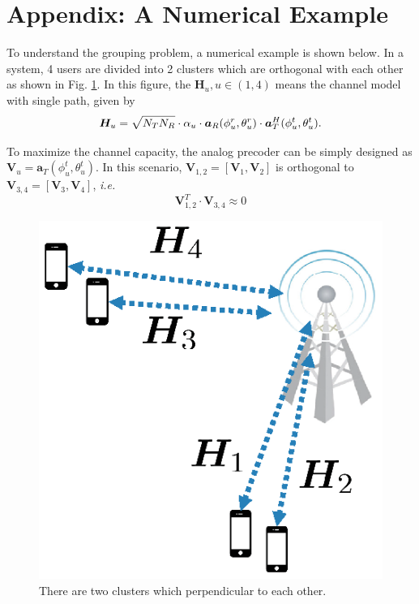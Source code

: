 \documentclass[conference]{IEEEtran}
\begin{document}



\section{Appendix: A Numerical Example}

To understand the grouping problem, a numerical example is shown below. In a system, 4 users are divided into 2 clusters which are orthogonal with each other as shown in Fig. \ref{fig:group}. In this figure, the $\bm{H}_u, u\in(1,4)$ means the channel model with single path, given by 
\begin{equation}{\label{eq:HuLu1}}
\bm{H}_u = \sqrt{N_{T}N_{R}}\cdot\alpha_u \cdot\bm{a}_{R}(\phi^r_{u},\theta^r_{u})\cdot\bm{a}^{H}_{T}(\phi^t_{u},\theta^t_{u}).
\end{equation}

To maximize the channel capacity, the analog precoder can be simply designed as $\bm{V}_u = \bm{a}_{T}(\phi^t_{u},\theta^t_{u})$. In this scenario, $\bm{V}_{1,2} = [\bm{V}_1, \bm{V}_2]$ is orthogonal to $\bm{V}_{3,4} = [\bm{V}_3, \bm{V}_4]$, \textit{i.e.} 
\begin{equation}\label{orthognal}
\bm{V}^T_{1,2}\cdot\bm{V}_{3,4}\approx 0
\end{equation}

\begin{figure}[h]
	\begin{center}
		\includegraphics[scale=0.65]{PPTFigure/group.eps}
		\caption{There are two clusters which perpendicular to each other.}\label{fig:group}
	\end{center}
\end{figure}
\end{document}
